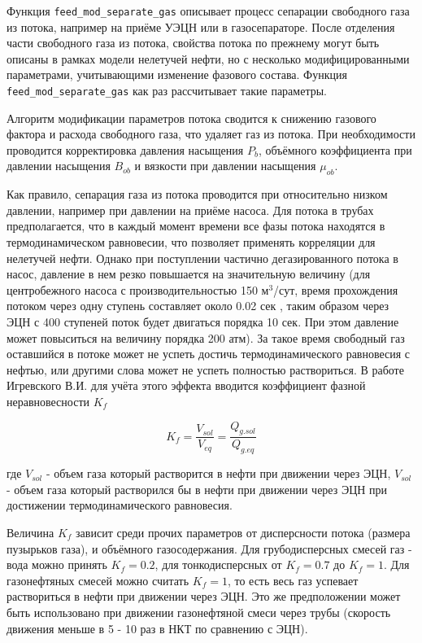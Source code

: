 Функция \texttt{feed_mod_separate_gas} описывает процесс сепарации свободного газа из потока, например на приёме УЭЦН или в газосепараторе.
После отделения части свободного газа из потока, свойства потока по прежнему могут быть описаны в рамках модели нелетучей нефти, но с несколько модифицированными параметрами, учитывающими изменение фазового состава. Функция \texttt{feed_mod_separate_gas} как раз рассчитывает такие параметры.

Алгоритм модификации параметров потока сводится к снижению газового фактора и расхода свободного газа, что удаляет газ из потока. При необходимости проводится корректировка давления насыщения $P_b$, объёмного коэффициента при давлении насыщения $B_{ob}$ и вязкости при давлении насыщения $\mu_{ob}$. 

Как правило, сепарация газа из потока проводится при относительно низком давлении, например при давлении на приёме насоса. Для потока в трубах предполагается, что  в каждый момент времени все фазы потока находятся в термодинамическом равновесии, что позволяет применять корреляции для нелетучей нефти.  Однако при поступлении частично дегазированного потока в насос, давление в нем резко повышается на значительную величину (для центробежного насоса с производительностью 150 м$^3$/сут, время прохождения потоком через одну ступень составляет около 0.02 сек \cite{diss_Igrevesky_ESP_gas}, таким образом через ЭЦН с 400 ступеней поток будет двигаться порядка 10 сек. При этом давление может повыситься на величину порядка 200 атм). За такое время свободный газ оставшийся в потоке может не успеть достичь термодинамического равновесия с нефтью, или другими слова может не успеть полностью раствориться. В работе Игревского В.И. \cite{diss_Igrevesky_ESP_gas} для учёта этого эффекта вводится коэффициент фазной неравновесности $K_f$

$$K_f = \frac{V_{sol}}{V_{eq}}= \frac{Q_{g.sol}}{Q_{g.eq}}$$

где  $V_{sol}$ - объем газа который растворится в нефти при движении через ЭЦН, $V_{sol}$ - объем газа который растворился бы в нефти при движении через ЭЦН при достижении термодинамического равновесия. 

Величина $K_f$ зависит среди прочих параметров от дисперсности потока (размера пузырьков газа), и объёмного газосодержания.  Для грубодисперсных смесей газ - вода можно принять $K_f=0.2$, для тонкодисперсных от $K_f=0.7$ до $K_f=1$. Для газонефтяных смесей можно считать $K_f=1$, то есть весь газ успевает раствориться в нефти при движении через ЭЦН. Это же предположении может быть использовано при движении газонефтяной смеси через трубы (скорость движения меньше в 5 - 10 раз в НКТ по сравнению с ЭЦН).

